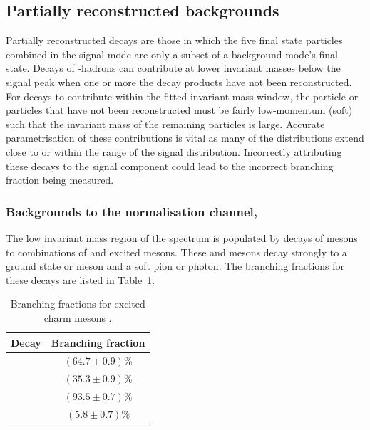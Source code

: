 \subsection{Partially reconstructed backgrounds}
\label{sec:B2DsKK_partrecocomps}

Partially reconstructed decays are those in which the five final state particles combined in the signal mode are only a subset of a background mode's final state.
Decays of \bquark-hadrons can contribute at lower invariant masses below the signal peak when one or more the decay products have not been reconstructed. 
For decays to contribute within the fitted \Bp invariant mass window, the particle or particles that have not been reconstructed must be fairly low-momentum (soft) such that the invariant mass of the remaining particles is large. Accurate parametrisation of these contributions is vital as many of the distributions extend close to or within the range of the signal distribution. Incorrectly attributing these decays to the signal component could lead to the incorrect branching fraction being measured. 

\subsubsection{Backgrounds to the normalisation channel, \decay{\Bp}{\Dsp\Dzb}}
\label{sec:B2DsKK_norm_partreco}

The low invariant mass region of the \Dsp\Dzb spectrum is populated by decays of \Bp mesons to combinations of \D and excited \D mesons. These \Dstarzb and \Dss mesons decay strongly to a ground state \Dzb or \Dsp meson and a soft pion or photon. The branching fractions for these decays are listed in Table~\ref{tab:dstar_BFs}.


\begin{table}[h]
\centering
\begin{tabular}{ l c }

\hline
Decay                           & Branching fraction \\ 
\hline
\decay{\Dstarzb}{\Dzb\Pgamma}   &   $(64.7\pm0.9)\%$ \\
\decay{\Dstarzb}{\Dzb\piz}      &   $(35.3\pm0.9)\%$ \\
\decay{\Dssp}{\Dsp\Pgamma}      &   $(93.5\pm0.7)\%$ \\
\decay{\Dssp}{\Dsp\piz}         &    $(5.8\pm0.7)\%$ \\
\hline

\end{tabular}  
\caption{Branching fractions for excited charm mesons \cite{PDG2016}. } 
\label{tab:dstar_BFs}
\end{table}

